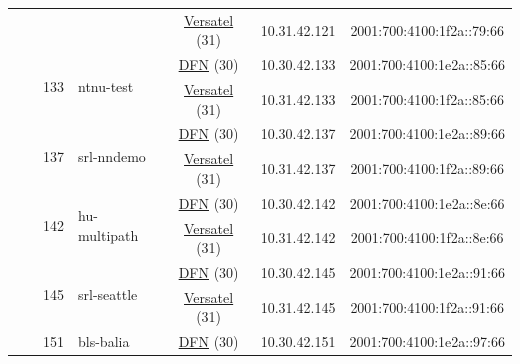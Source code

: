 \begin{small}
\begin{center}
\begin{longtable}{|c|c|c|c|c|c|c|c|}
  &  &  &  & \multicolumn{2}{|c|}{\tiny{\href{http://www.versatel.de}{Versatel} (31)}} & \tiny{10.31.42.121} & \tiny{2001:700:4100:1f2a::79:66} \\* \cline{3-3}\cline{4-4}\cline{5-5}\cline{6-6}\cline{7-7}\cline{8-8}
  &  & \multirow{2}{*}{\tiny{133}} & \multicolumn{1}{|l|}{\multirow{2}{*}{\tiny{ntnu-test}}} & \multicolumn{2}{|c|}{\tiny{\href{https://www.dfn.de}{DFN} (30)}} & \tiny{10.30.42.133} & \tiny{2001:700:4100:1e2a::85:66} \\* \cline{5-5}\cline{6-6}\cline{7-7}\cline{8-8}
  &  &  &  & \multicolumn{2}{|c|}{\tiny{\href{http://www.versatel.de}{Versatel} (31)}} & \tiny{10.31.42.133} & \tiny{2001:700:4100:1f2a::85:66} \\* \cline{3-3}\cline{4-4}\cline{5-5}\cline{6-6}\cline{7-7}\cline{8-8}
  &  & \multirow{2}{*}{\tiny{137}} & \multicolumn{1}{|l|}{\multirow{2}{*}{\tiny{srl-nndemo}}} & \multicolumn{2}{|c|}{\tiny{\href{https://www.dfn.de}{DFN} (30)}} & \tiny{10.30.42.137} & \tiny{2001:700:4100:1e2a::89:66} \\* \cline{5-5}\cline{6-6}\cline{7-7}\cline{8-8}
  &  &  &  & \multicolumn{2}{|c|}{\tiny{\href{http://www.versatel.de}{Versatel} (31)}} & \tiny{10.31.42.137} & \tiny{2001:700:4100:1f2a::89:66} \\* \cline{3-3}\cline{4-4}\cline{5-5}\cline{6-6}\cline{7-7}\cline{8-8}
  &  & \multirow{2}{*}{\tiny{142}} & \multicolumn{1}{|l|}{\multirow{2}{*}{\tiny{hu-multipath}}} & \multicolumn{2}{|c|}{\tiny{\href{https://www.dfn.de}{DFN} (30)}} & \tiny{10.30.42.142} & \tiny{2001:700:4100:1e2a::8e:66} \\* \cline{5-5}\cline{6-6}\cline{7-7}\cline{8-8}
  &  &  &  & \multicolumn{2}{|c|}{\tiny{\href{http://www.versatel.de}{Versatel} (31)}} & \tiny{10.31.42.142} & \tiny{2001:700:4100:1f2a::8e:66} \\* \cline{3-3}\cline{4-4}\cline{5-5}\cline{6-6}\cline{7-7}\cline{8-8}
  &  & \multirow{2}{*}{\tiny{145}} & \multicolumn{1}{|l|}{\multirow{2}{*}{\tiny{srl-seattle}}} & \multicolumn{2}{|c|}{\tiny{\href{https://www.dfn.de}{DFN} (30)}} & \tiny{10.30.42.145} & \tiny{2001:700:4100:1e2a::91:66} \\* \cline{5-5}\cline{6-6}\cline{7-7}\cline{8-8}
  &  &  &  & \multicolumn{2}{|c|}{\tiny{\href{http://www.versatel.de}{Versatel} (31)}} & \tiny{10.31.42.145} & \tiny{2001:700:4100:1f2a::91:66} \\* \cline{3-3}\cline{4-4}\cline{5-5}\cline{6-6}\cline{7-7}\cline{8-8}
  &  & \multirow{2}{*}{\tiny{151}} & \multicolumn{1}{|l|}{\multirow{2}{*}{\tiny{bls-balia}}} & \multicolumn{2}{|c|}{\tiny{\href{https://www.dfn.de}{DFN} (30)}} & \tiny{10.30.42.151} & \tiny{2001:700:4100:1e2a::97:66} \\* \cline{5-5}\cline{6-6}\cline{7-7}\cline{8-8}

\end{longtable}
\end{center}
\end{small}
